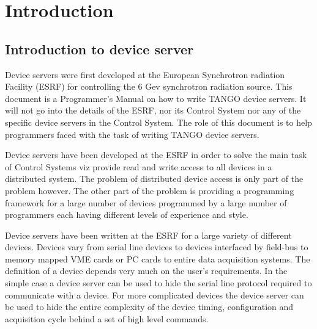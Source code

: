 
\chapter{Introduction}


\section{Introduction to device server}

Device servers were first developed at the European Synchrotron radiation
Facility (ESRF) for controlling the 6 Gev synchrotron
radiation source. This document is a Programmer's Manual on how to
write TANGO device servers. It will not go into the details of the
ESRF, nor its Control System nor any of the specific
device servers in the Control System. The role of this document is
to help programmers faced with the task of writing TANGO device servers.

Device servers have been developed at the ESRF in order
to solve the main task of Control Systems viz provide read and write
access to all devices in a distributed system. The problem of distributed
device access is only part of the problem however. The other part
of the problem is providing a programming framework for a large number
of devices programmed by a large number of programmers each having
different levels of experience and style.

Device servers have been written at the ESRF for a large
variety of different devices. Devices vary from serial line devices
to devices interfaced by field-bus to memory mapped VME cards or PC
cards to entire data acquisition systems. The definition of a device
depends very much on the user's requirements. In the simple case a
device server can be used to hide the serial line protocol required
to communicate with a device. For more complicated devices the device
server can be used to hide the entire complexity of the device timing,
configuration and acquisition cycle behind a set of high level commands.

